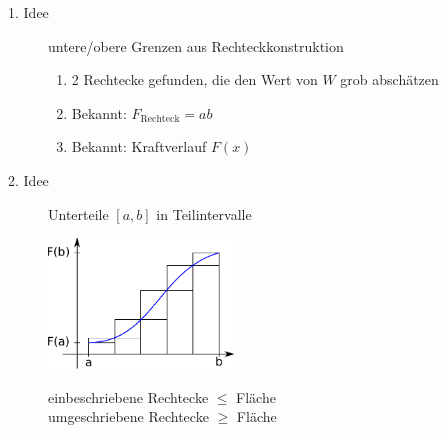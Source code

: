 \begin{description}
  \item[1. Idee] untere/obere Grenzen aus Rechteckkonstruktion

\begin{enumerate}
	\item 2 Rechtecke gefunden, die den Wert von $W$ grob abschätzen
	\item Bekannt: $F_{\text{Rechteck}} = ab$
	\item Bekannt: Kraftverlauf $F(x)$
\end{enumerate}

  \item[2. Idee] Unterteile $[a, b]$ in Teilintervalle
\begin{center}
	\includegraphics[width=0.4\textwidth]{include/20100126-3.pdf}
\end{center}
einbeschriebene Rechtecke $\leq$ Fläche \\
umgeschriebene Rechtecke $\geq$ Fläche

\end{description}